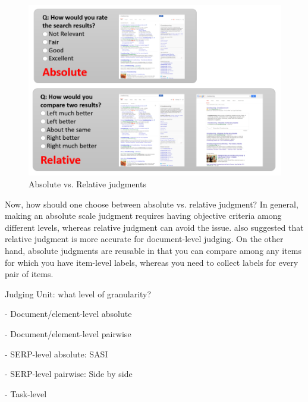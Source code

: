 \documentclass[openany]{now} %
\newcommand{\newpar}{\bigskip\noindent}
\begin{document}
\begin{figure}
	\begin{center}
		\includegraphics[scale=0.5]{images/judgment_types}
		\caption{Absolute vs. Relative judgments} 
		\label{fig:judgment_types}
	\end{center}
\end{figure}

Now, how should one choose between absolute vs. relative judgment? In general, making an absolute scale judgment requires having objective criteria among different levels, whereas relative judgment can avoid the issue. \cite{CarteretteBCD08} also suggested that relative judgment is more accurate for document-level judging. On the other hand, absolute judgments are reusable in that you can compare among any items for which you have item-level labels, whereas you need to collect labels for every pair of items. 


\newpar
Judging Unit: what level of granularity?

- Document/element-level absolute \cite{Golbus:2014:CDR}

- Document/element-level pairwise \cite{CarteretteBCD08} \cite{Chandar2013} \cite{Arguello:2011}

- SERP-level absolute: SASI \cite{Bailey2010} 

- SERP-level pairwise: Side by side \cite{Thomas2006} \cite{Al-Maskari2007} \cite{Kim:2013}

- Task-level \cite{Xu:2009}
\end{document}
